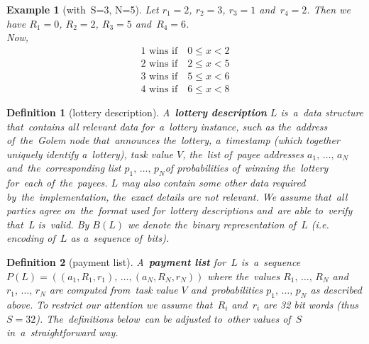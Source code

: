 \documentclass[a4paper]{article}
\newtheorem*{dfnt}{Definition}
\newtheorem*{exmp}{Example}
\begin{document}
    \begin{exmp}[with~S=3, N=5]
        Let $r_1 = 2$, $r_2 = 3$, $r_3 = 1$ and~$r_4 = 2$. Then we have $R_1 = 0$, $R_2 = 2$, $R_3 = 5$ and~$R_4 = 6$.\\
        Now,
        \begin{displaymath}
            \begin{array}{c}
                1 \text{ wins if} \quad 0 \leq x < 2\\
                2 \text{ wins if} \quad 2 \leq x < 5\\
                3 \text{ wins if} \quad 5 \leq x < 6\\
                4 \text{ wins if} \quad 6 \leq x < 8
            \end{array}
        \end{displaymath}
    \end{exmp}

    \begin{dfnt}[lottery description]
        A~\textbf{lottery description} $L$ is~a~data structure that~contains all relevant data for~a~lottery instance,
        such as the~address of~the~Golem node that~announces the~lottery, a~timestamp (which together uniquely identify
        a~lottery), task value $V$, the~list of~payee addresses $a_1,\,\ldots,\, a_N$ and~the~corresponding list
        $p_1, \,\ldots,\, p_N $of probabilities of~winning the~lottery for~each of~the~payees. $L$ may also contain
        some other data required by~the~implementation, the~exact details are not relevant. We assume that~all parties
        agree on~the~format used for~lottery descriptions and~are able to~verify that~L is~valid. By $B(L)$ we denote
        the~binary representation of~$L$ (i.e. encoding of~$L$ as a~sequence of~bits).
    \end{dfnt}


    \begin{dfnt}[payment list]
        A~\textbf{payment list} for~$L$ is~a~sequence $P(L) = ((a_1, R_1, r_1), \,\ldots, (a_N, R_N, r_N))$ where the~values
        $R_1,\,\ldots,\, R_N$ and~$r_1,\,\ldots,\, r_N$ are computed from~task value $V$ and~probabilities
        $p_1,\,\ldots,\,p_N$ as described above. To restrict our attention we assume that~$R_i$ and~$r_i$ are 32 bit
        words (thus $S = 32$). The~definitions below~can be adjusted to~other values of~$S$ in~a~straightforward way.
    \end{dfnt}
\end{document}
